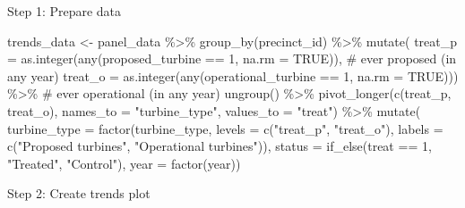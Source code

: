 \documentclass[
  letterpaper,
  DIV=11,
  numbers=noendperiod]{scrartcl}
\newenvironment{Shaded}{\begin{snugshade}}{\end{snugshade}}
\newcommand{\AttributeTok}[1]{\textcolor[rgb]{0.40,0.45,0.13}{#1}}
\newcommand{\CommentTok}[1]{\textcolor[rgb]{0.37,0.37,0.37}{#1}}
\newcommand{\ConstantTok}[1]{\textcolor[rgb]{0.56,0.35,0.01}{#1}}
\newcommand{\DecValTok}[1]{\textcolor[rgb]{0.68,0.00,0.00}{#1}}
\newcommand{\FunctionTok}[1]{\textcolor[rgb]{0.28,0.35,0.67}{#1}}
\newcommand{\NormalTok}[1]{\textcolor[rgb]{0.00,0.23,0.31}{#1}}
\newcommand{\OtherTok}[1]{\textcolor[rgb]{0.00,0.23,0.31}{#1}}
\newcommand{\SpecialCharTok}[1]{\textcolor[rgb]{0.37,0.37,0.37}{#1}}
\newcommand{\StringTok}[1]{\textcolor[rgb]{0.13,0.47,0.30}{#1}}
\begin{document}
Step 1: Prepare data

\begin{Shaded}
\begin{Highlighting}[]
\NormalTok{trends\_data }\OtherTok{\textless{}{-}}\NormalTok{ panel\_data }\SpecialCharTok{\%\textgreater{}\%}
  \FunctionTok{group\_by}\NormalTok{(precinct\_id) }\SpecialCharTok{\%\textgreater{}\%}
  \FunctionTok{mutate}\NormalTok{(}
    \AttributeTok{treat\_p =} \FunctionTok{as.integer}\NormalTok{(}\FunctionTok{any}\NormalTok{(proposed\_turbine }\SpecialCharTok{==} \DecValTok{1}\NormalTok{, }\AttributeTok{na.rm =} \ConstantTok{TRUE}\NormalTok{)),  }\CommentTok{\# ever proposed (in any year)}
    \AttributeTok{treat\_o =} \FunctionTok{as.integer}\NormalTok{(}\FunctionTok{any}\NormalTok{(operational\_turbine }\SpecialCharTok{==} \DecValTok{1}\NormalTok{, }\AttributeTok{na.rm =} \ConstantTok{TRUE}\NormalTok{))) }\SpecialCharTok{\%\textgreater{}\%} \CommentTok{\# ever operational (in any year)}
  \FunctionTok{ungroup}\NormalTok{() }\SpecialCharTok{\%\textgreater{}\%} 
  \FunctionTok{pivot\_longer}\NormalTok{(}\FunctionTok{c}\NormalTok{(treat\_p, treat\_o),}
               \AttributeTok{names\_to =} \StringTok{"turbine\_type"}\NormalTok{, }\AttributeTok{values\_to =} \StringTok{"treat"}\NormalTok{) }\SpecialCharTok{\%\textgreater{}\%} 
  \FunctionTok{mutate}\NormalTok{(}
      \AttributeTok{turbine\_type =} \FunctionTok{factor}\NormalTok{(turbine\_type,}
                            \AttributeTok{levels =} \FunctionTok{c}\NormalTok{(}\StringTok{"treat\_p"}\NormalTok{, }\StringTok{"treat\_o"}\NormalTok{),}
                            \AttributeTok{labels =} \FunctionTok{c}\NormalTok{(}\StringTok{"Proposed turbines"}\NormalTok{, }\StringTok{"Operational turbines"}\NormalTok{)),  }
    \AttributeTok{status =} \FunctionTok{if\_else}\NormalTok{(treat }\SpecialCharTok{==} \DecValTok{1}\NormalTok{, }\StringTok{"Treated"}\NormalTok{, }\StringTok{"Control"}\NormalTok{),}
    \AttributeTok{year   =} \FunctionTok{factor}\NormalTok{(year))}
\end{Highlighting}
\end{Shaded}

Step 2: Create trends plot
\end{document}
